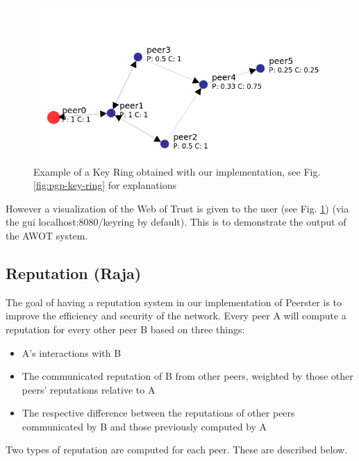 \documentclass[]{article}
\begin{document}
\begin{figure}[h]
	\includegraphics[width=\textwidth,height=\textheight,keepaspectratio]{keyring_example1}
	\centering
	\caption{Example of a Key Ring obtained with our implementation, see Fig. \ref{fig:pgp-key-ring} for explanations}
	\label{fig:keyring_ex1}
\end{figure}

However a visualization of the Web of Trust is given to the user (see Fig. \ref{fig:keyring_ex1}) (via the gui localhost:8080/keyring by default). This is to demonstrate the output of the AWOT system.

\subsection{Reputation (Raja)}
\label{sec:goals-funcs-rep}
The goal of having a reputation system in our implementation of Peerster is to improve the efficiency and security of the network.
Every peer A will compute a reputation for every other peer B based on three things:

\begin{itemize}
\item A's interactions with B
\item The communicated reputation of B from other peers, weighted by those other peers' reputations relative to A
\item The respective difference between the reputations of other peers communicated by B and those previously computed by A
\end{itemize}

Two types of reputation are computed for each peer. These are described below.
\end{document}

